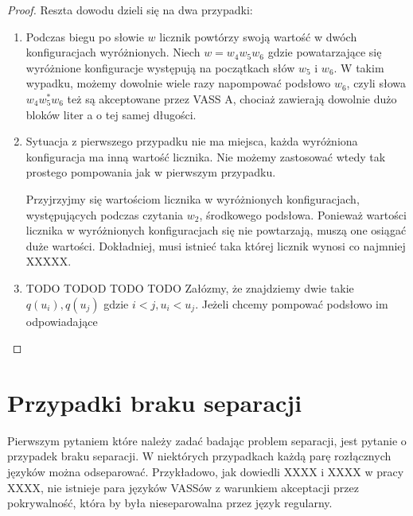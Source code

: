 \begin{example}
\begin{proof}
            Reszta dowodu dzieli się na dwa przypadki:
            \begin{enumerate}
                \item Podczas biegu po słowie $w$ licznik powtórzy swoją wartość w dwóch konfiguracjach wyróżnionych.
                Niech $w=w_4 w_5 w_6$ gdzie powatarzające się wyróżnione konfiguracje występują na początkach słów $w_5$ i $w_6$.
                W takim wypadku, możemy dowolnie wiele razy napompować podsłowo $w_6$, czyli słowa $w_4 w_5^* w_6$ też są akceptowane
                przez VASS A, chociaż zawierają dowolnie dużo bloków liter a o tej samej długości.
                \item Sytuacja z pierwszego przypadku nie ma miejsca, każda wyróżniona konfiguracja ma inną wartość licznika.
                Nie możemy zastosować wtedy tak prostego pompowania jak w pierwszym przypadku.


                Przyjrzyjmy się wartościom licznika w wyróżnionych konfiguracjach, występujących podczas czytania $w_2$, środkowego podsłowa.
                Ponieważ wartości licznika w wyróżnionych konfiguracjach się nie powtarzają, muszą one osiągać duże wartości.
                Dokładniej, musi istnieć taka której licznik wynosi co najmniej XXXXX.
                \item TODO TODOD TODO TODO
                Załózmy, że znajdziemy dwie takie $q(u_i),q(u_j)$ gdzie $i<j,u_i < u_j$.
                Jeżeli chcemy pompować podsłowo im odpowiadające
            \end{enumerate}


        \end{proof}


    \end{example}



    \chapter{Przypadki braku separacji}

    Pierwszym pytaniem które należy zadać badając problem separacji, jest pytanie o przypadek braku separacji.
    W niektórych przypadkach każdą parę rozłącznych języków można odseparować.
    Przykładowo, jak dowiedli XXXX i XXXX w pracy XXXX, nie istnieje para języków VASSów z warunkiem akceptacji przez pokrywalność,
    która by była nieseparowalna przez język regularny.


